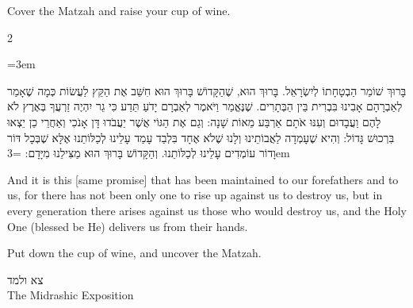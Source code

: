 \documentclass[11pt, openany]{book}
\newcommand{\instruction}[1]{%
  \par\vspace{3pt}
  \begin{tcolorbox}[
    enhanced,
    breakable,
    colback=sederlight,
    colframe=sedergold!40,
    boxrule=1pt,
    left=10pt,
    right=6pt,
    top=4pt,
    bottom=4pt,
    borderline west={3pt}{0pt}{sederwine!60},
    arc=6pt,
    outer arc=6pt,
  ]
    {\kidsinstructionfont\small\textcolor{sederwine}{#1}}
  \end{tcolorbox}
  \par\vspace{2pt}
}
\newenvironment{bilingual}{%
  \par\vspace{4pt}%
  \begin{paracol}{2}%
}{%
  \end{paracol}%
  \par\vspace{2pt}%
}
\newenvironment{hebrewcol}{%
  \switchcolumn[1]%
  \begingroup
  \RTL
  \hebrewfont\large
  \setstretch{1.4}%
  \emergencystretch=3em
  \tolerance=9999
  \parindent=0pt\relax
}{%
  \endRTL
  \endgroup
}
\newenvironment{englishcol}{%
  \switchcolumn[0]%
  \begingroup
  \setstretch{1.4}%
  \emergencystretch=3em
  \tolerance=9999
  \normalsize
  \rightskip=0.12in\relax
}{%
  \endgroup
}
\newcommand{\subsedertitle}[2]{%
  \par\vspace{8pt}
  \begin{center}
    {\kidssteptitlefonthebrew\textcolor{sederblue}{\beginR #1\endR}}\\[3pt]
    {\kidssteptitlefont\normalsize\textcolor{sederblue}{#2}}
  \end{center}
  \par\vspace{3pt}
}
\begin{document}
\instruction{Cover the Matzah and raise your cup of wine.}

\begin{bilingual}
\begin{hebrewcol}
בָּרוּךְ שׁוֹמֵר הַבְטָחָתוֹ לְיִשְׂרָאֵל. בָּרוּךְ הוּא, שֶׁהַקָּדוֹשׁ בָּרוּךְ הוּא חִשֵּׁב אֶת הַקֵּץ לַעֲשׂוֹת כְּמָה שֶׁאָמַר לְאַבְרָהָם אָבִינוּ בִּבְרִית בֵּין הַבְּתָרִים. שֶׁנֶּאֱמַר וַיֹּאמֶר לְאַבְרָם יָדֹעַ תֵּדַע כִּי גֵר יִהְיֶה זַרְעֲךָ בְּאֶרֶץ לֹא לָהֶם וַעֲבָדוּם וְעִנּוּ אֹתָם אַרְבַּע מֵאוֹת שָׁנָה: וְגַם אֶת הַגּוֹי אֲשֶׁר יַעֲבֹדוּ דָּן אָנֹכִי וְאַחֲרֵי כֵן יֵצְאוּ בִּרְכוּשׁ גָּדוֹל:
וְהִיא שֶׁעָמְדָה לַאֲבוֹתֵינוּ וְלָנוּ שֶׁלֹא אֶחָד בִּלְבַד עָמַד עָלֵינוּ לְכַלּוֹתֵנוּ אֶלָּא שֶׁבְּכָל דּוֹר וָדוֹר עוֹמְדִים עָלֵינוּ לְכַלּוֹתֵנוּ. וְהַקָּדוֹשׁ בָּרוּךְ הוּא מַצִּילֵנוּ מִיָּדָם:
\end{hebrewcol}
\begin{englishcol}
And it is this [same promise] that has been maintained to our forefathers and to us, for there has not been only one to rise up against us to destroy us, but in every generation there arises against us those who would destroy us, and the Holy One (blessed be He) delivers us from their hands.
\end{englishcol}
\end{bilingual}
\instruction{Put down the cup of wine, and uncover the Matzah.}

\subsedertitle{צא ולמד}{The Midrashic Exposition}
\end{document}
